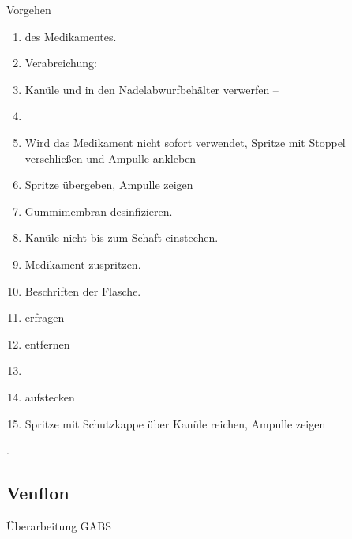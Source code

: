 \documentclass[
ngerman,
paper=a4,
asymmetric,
fontsize=10pt,
draft=false,
numbers=noenddot,
bibtotocnumbered,
footnotes=multiple,
]{scrreprt}
\newcommand{\jNEUende}{\newline{\color{green}\rule{\linewidth}{3pt}\newline}}
\begin{document}
\begin{ProcedureStepsWide}{Vorgehen}
\begin{enumerate}
  Beim Einführen der Kanüle in die Ampulle den
     Ampullenrand nicht berühren.
  \item {} des
   Medikamentes.
   \item Verabreichung:
     \item Kanüle  und in den
    Nadelabwurfbehälter verwerfen -- 
    \item {}
     \item Wird das Medikament nicht sofort verwendet, Spritze mit
    Stoppel verschließen und Ampulle ankleben
    \item Spritze übergeben, Ampulle zeigen
     \item Gummimembran desinfizieren.
     \item Kanüle nicht bis zum Schaft einstechen.
     \item Medikament zuspritzen.
     \item Beschriften der Flasche.
    \item {} erfragen
    \item {}  entfernen
    \item {}
    \item {} aufstecken
    \item Spritze mit Schutzkappe über Kanüle reichen, Ampulle zeigen
 \end{enumerate}
 \end{ProcedureStepsWide}
.
\jNEUende


\subsection{Venflon}
Überarbeitung GABS
\end{document}
